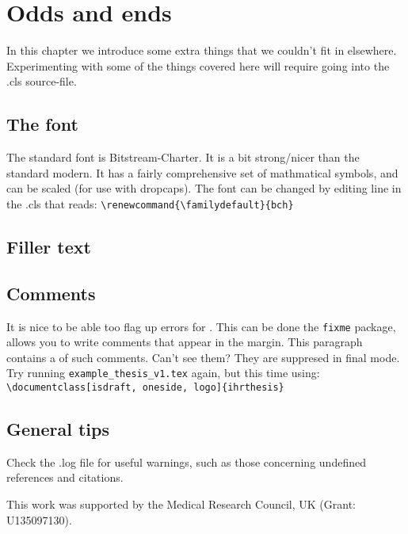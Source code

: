 \chapter{Odds and ends}

\begin{chapabstract}
In this chapter we introduce some extra things that we couldn't fit in elsewhere. Experimenting with some of the things covered here will require going into the .cls source-file.
\end{chapabstract}

\section{The font}
The standard font is Bitstream-Charter. It is a bit strong/nicer than the standard modern. It has a fairly comprehensive set of mathmatical symbols, and can be scaled (\eg for use with dropcaps). The font can be changed by editing line in the .cls that reads: \verb|\renewcommand{\familydefault}{bch}|

\section{Filler text}
\lipsum[2]

\section{Comments}
It is  nice to be able too flag up errors for . This can be done  the \verb|fixme| package,  allows you to write comments that appear in the margin. This paragraph contains a  of such comments. Can't see them? They are suppresed in final mode. Try running \verb|example_thesis_v1.tex| again, but this time using: \verb|\documentclass[isdraft, oneside, logo]{ihrthesis}|

\section{General tips}
Check the .log file for useful warnings, such as those concerning undefined references and citations.

\begin{chapacknowledgements}
This work was supported by the Medical Research Council, UK (Grant: U135097130).
\end{chapacknowledgements}


